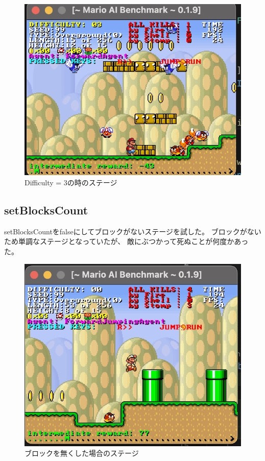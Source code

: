 \documentclass[a4paper,11pt]{jsarticle}
\begin{document}
\begin{figure}[h]
  \centering
  \includegraphics[scale=0.6]{
    images/report1/image-diff3.png
  }
  \caption[]{Difficulty = 3の時のステージ}
\end{figure}


\subsection*{setBlocksCount}
setBlocksCountをfalseにしてブロックがないステージを試した。
ブロックがないため単調なステージとなっていたが、
敵にぶつかって死ぬことが何度かあった。

\begin{figure}[h]
  \centering
  \includegraphics*[scale=0.6]{
    images/report1/image-no-block.png
  }
  \caption[]{ブロックを無くした場合のステージ}
\end{figure}
\end{document}
